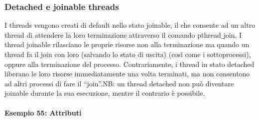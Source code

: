         \subsubsection{Detached e joinable threads}
         I threads vengono creati di default nello stato joinable, il che consente ad un altro thread di attendere la loro terminazione attraverso il comando pthread$\_$join. I thread joinable rilasciano le proprie risorse non alla terminazione ma quando un thread fa il join con loro (salvando lo stato di uscita) (così come i sottoprocessi), oppure alla terminazione del processo. Contrariamente, i thread in stato detached liberano le loro risorse immediatamente una volta terminati, ma non consentono ad altri processi di fare il “join”.NB:  un  thread  detached  non  può  diventare  joinable  durante  la  sua  esecuzione, mentre il contrario è possibile.
            \paragraph{Esempio 55: Attributi}\hfill \break
            
